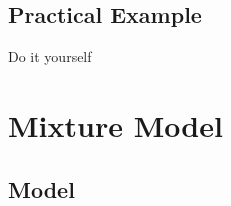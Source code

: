 \documentclass{beamer}\usepackage[]{graphicx}\usepackage[]{color}
\begin{document}
\subsection*{Practical Example}
\begin{frame}[fragile]{Do it yourself}
\end{frame}
\section{Mixture Model}

\subsection*{Model}
\end{document}
